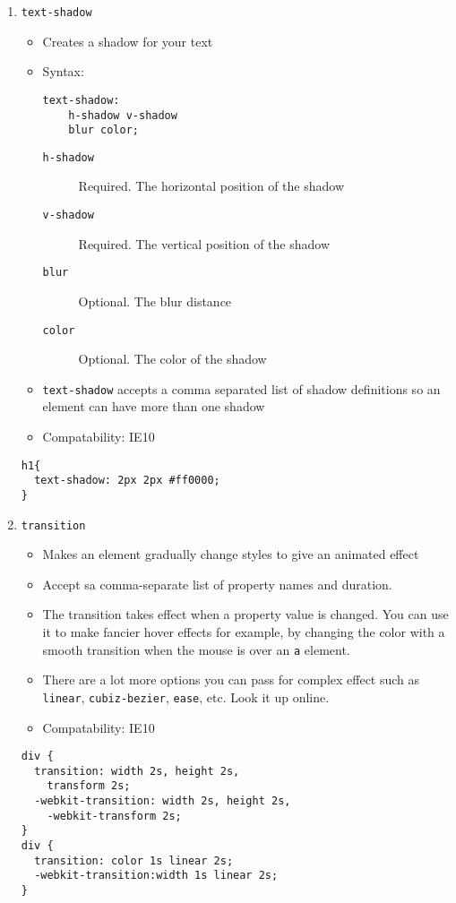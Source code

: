 \documentclass[10pt, twocolumn]{article}
\begin{document}
\begin{enumerate}
\item \texttt{text-shadow}
\begin{itemize}
\item Creates a shadow for your text
\item Syntax:
\begin{lstlisting}[frame=single]
text-shadow: 
    h-shadow v-shadow 
    blur color;
\end{lstlisting}
\begin{description}
\item[\texttt{h-shadow}] Required.  The horizontal position of the shadow
\item[\texttt{v-shadow}] Required.  The vertical position of the shadow
\item[\texttt{blur}] Optional.  The blur distance
\item[\texttt{color}] Optional.  The color of the shadow
\end{description}
\item \texttt{text-shadow} accepts a comma separated list of shadow definitions so an element can have more than one shadow
\item Compatability: IE10
\end{itemize}
\begin{lstlisting}[frame=single]
h1{
  text-shadow: 2px 2px #ff0000;
}
\end{lstlisting}
\item \texttt{transition}
\begin{itemize}
\item Makes an element gradually change styles to give an animated effect
\item Accept sa comma-separate list of property names and duration.
\item The transition takes effect when a property value is changed.  You can use it to make fancier hover effects for example, by changing the color with a smooth transition when the mouse is over an \texttt{a} element.
\item There are a lot more options you can pass for complex effect such as \texttt{linear}, \texttt{cubiz-bezier}, \texttt{ease}, etc.  Look it up online.
\item Compatability: IE10
\end{itemize}
\begin{lstlisting}[frame=single]
div {
  transition: width 2s, height 2s,
    transform 2s;
  -webkit-transition: width 2s, height 2s, 
    -webkit-transform 2s;
}
div {
  transition: color 1s linear 2s;
  -webkit-transition:width 1s linear 2s;
}
\end{lstlisting}
\end{enumerate}
\end{document}
